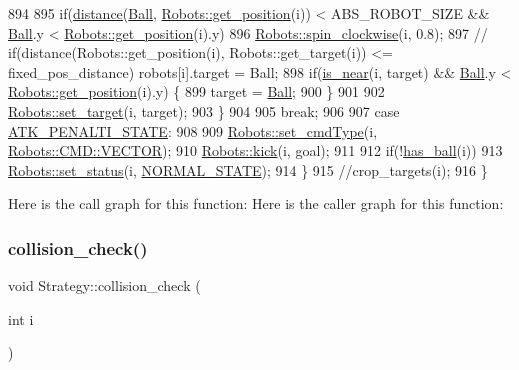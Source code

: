 \begin{DoxyCode}
894 
895                 \textcolor{keywordflow}{if}(\hyperlink{class_strategy_aacce05caed71553c4efd2d28c9c3aa39}{distance}(\hyperlink{class_strategy_abd16b6276e747f6cd99a19963ff5495b}{Ball}, \hyperlink{class_robots_a1fca8f2f5070176faa6ba1efa2f1ff14}{Robots::get\_position}(i)) < ABS\_ROBOT\_SIZE
       && \hyperlink{class_strategy_abd16b6276e747f6cd99a19963ff5495b}{Ball}.y < \hyperlink{class_robots_a1fca8f2f5070176faa6ba1efa2f1ff14}{Robots::get\_position}(i).y)
896                     \hyperlink{class_robots_a6bd2e21654da3f7c3acc380a2b838240}{Robots::spin\_clockwise}(i, 0.8);
897                 \textcolor{comment}{// if(distance(Robots::get\_position(i), Robots::get\_target(i)) <= fixed\_pos\_distance)
       robots[i].target = Ball;}
898                 \textcolor{keywordflow}{if}(\hyperlink{class_strategy_a39e538cde3f236f918ad8b7501c92987}{is\_near}(i, target) && \hyperlink{class_strategy_abd16b6276e747f6cd99a19963ff5495b}{Ball}.y < 
      \hyperlink{class_robots_a1fca8f2f5070176faa6ba1efa2f1ff14}{Robots::get\_position}(i).y) \{
899                     target = \hyperlink{class_strategy_abd16b6276e747f6cd99a19963ff5495b}{Ball};
900                 \}
901 
902                 \hyperlink{class_robots_ac1cd5c41b6e5d5643b2186ca51699c8f}{Robots::set\_target}(i, target);
903             \}
904 
905             \textcolor{keywordflow}{break};
906 
907         \textcolor{keywordflow}{case} \hyperlink{strategy_8cpp_af9daa148169d5771f87d930a1a1a2c04}{ATK\_PENALTI\_STATE}:
908 
909             \hyperlink{class_robots_a748870113b457e47bccaf4cd329f4378}{Robots::set\_cmdType}(i, \hyperlink{serial_w_8hpp_ac6e89954deaa373db52a91ac6db50884}{Robots::CMD::VECTOR});
910             \hyperlink{class_robots_afb5fa179562bd2f6f45c9231c2bbca88}{Robots::kick}(i, goal);
911 
912             \textcolor{keywordflow}{if}(!\hyperlink{class_strategy_af607e7b52f48a6c490549898e752fda2}{has\_ball}(i))
913                 \hyperlink{class_robots_aa287cd821cfe9c6c65fb5cdfd77c5050}{Robots::set\_status}(i, \hyperlink{strategy_8cpp_a71fb3922bc79c3f8414c394f631c7c84}{NORMAL\_STATE});
914     \}
915     \textcolor{comment}{//crop\_targets(i);}
916 \}
\end{DoxyCode}
Here is the call graph for this function\+:
Here is the caller graph for this function\+:
\mbox{\label{class_strategy_a8d1fa6e7cb13f7eb135bc853beef462d}} 
\subsubsection{\texorpdfstring{collision\+\_\+check()}{collision\_check()}}
{\footnotesize\ttfamily void Strategy\+::collision\+\_\+check (\begin{DoxyParamCaption}\item[{int}]{i }\end{DoxyParamCaption})}



